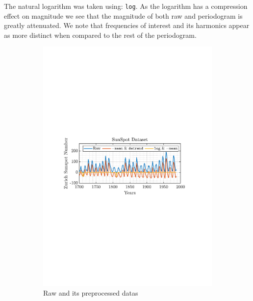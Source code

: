 \documentclass[12pt]{article}
\numberwithin{equation}{section}
\begin{document}
	The natural logarithm was taken using: \texttt{log}. As the logarithm has a compression effect on magnitude we see that the magnitude of both raw and periodogram is greatly attenuated. We note that frequencies of interest and its harmonics appear as more distinct when compared to the rest of the periodogram.

	\begin{figure}[H]
		\centering
		\begin{subfigure}{0.49\textwidth}
			\centering
			\includegraphics[trim={2.2cm 11.2cm 3.15cm  11.2cm}, clip, width=\textwidth]{../MATLAB/figures/q1_2a_fig01.pdf} 
			\captionsetup{justification=centering}
			\caption{Raw and its preprocessed datas}
		\end{subfigure}
		\begin{subfigure}{0.49\textwidth}
			\centering

\end{subfigure}
\end{figure}
\end{document}
